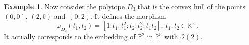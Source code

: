 \documentclass[a4paper,draft,reqno,12pt]{amsart}
\theoremstyle{definition}
\theoremstyle{definition}
\newtheorem{example}{Example}
\theoremstyle{remark}
\def\BK{{\mathbb K}}
\def\BK{{\mathbb K}}
\def\BP{{\mathbb P}}
\def\CO{\mathcal{O}}
\begin{document}
\begin{example}\label{projplane}
    Now consider the polytope $D_3$ that is the convex hull of the points $(0,0)$, $(2,0)$ and~$(0,2)$. It defines the morphism\begin{equation}\label{projplanemapping}
        \varphi_{D_3}(t_1,t_2)=[1:t_1:t_1^2:t_2:t_2^2:t_1t_2], \ t_1,t_2\in\BK^\times.
    \end{equation}It actually corresponds to the embedding of $\BP^2$ in $\BP^5$ with $\CO(2)$.

     \begin{figure}[h]
        \begin{minipage}{0.48\textwidth}
         \centering
         \begin{tikzpicture}[x=0.75pt,y=0.75pt,yscale=-1,xscale=1]


\end{tikzpicture}
\end{minipage}
\end{figure}
\end{example}
\end{document}
